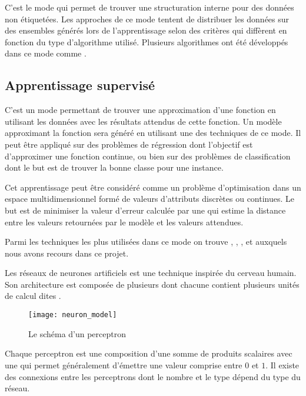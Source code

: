 C'est le mode qui permet de trouver une structuration interne pour des données
non étiquetées. Les approches de ce mode tentent de distribuer les données sur
des ensembles générés lors de l'apprentissage selon des critères qui diffèrent
en fonction du type d'algorithme utilisé. Plusieurs algorithmes ont été
développés dans ce mode comme .

\subsection{Apprentissage supervisé}

C'est un mode permettant de trouver une approximation d'une fonction en utilisant
les données avec les résultats attendus de cette fonction. Un modèle approximant
la fonction sera généré en utilisant une des techniques de ce mode.
Il peut être appliqué sur des problèmes de régression dont l'objectif est
d'approximer une fonction continue, ou bien sur des problèmes de classification
dont le but est de trouver la bonne classe pour une instance.

Cet apprentissage peut être considéré comme un problème d'optimisation
dans un espace multidimensionnel formé de valeurs d'attributs discrètes ou
continues. Le but est de minimiser la valeur d'erreur calculée par une
 qui estime la distance entre les valeurs retournées
par le modèle et les valeurs attendues.

Parmi les techniques les plus utilisées dans ce mode on trouve
, ,
,
 et
 auxquels nous avons recours dans
ce projet.

Les réseaux de neurones artificiels est une technique inspirée du cerveau humain.
Son architecture est composée de plusieurs  dont chacune
contient plusieurs unités de calcul dites .

\begin{figure}[h]
\begin{center}
\texttt{[image: neuron\_model]}
\caption{Le schéma d'un perceptron}{\cite{karpathy2016cs231n}}
\end{center}
\end{figure}

Chaque perceptron est une composition d'une somme de
produits scalaires avec une  qui permet
généralement d'émettre une valeur comprise entre $0$ et $1$.
Il existe des connexions entre les perceptrons dont le nombre et le type dépend
du type du réseau.

